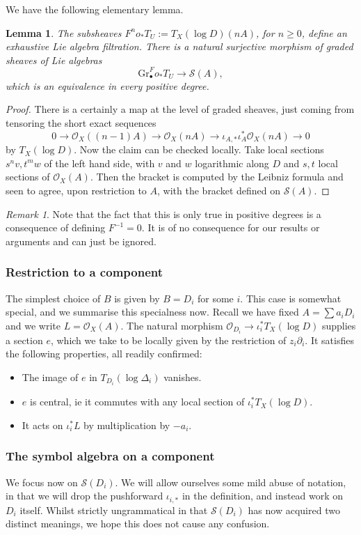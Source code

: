 \documentclass[12pt, oneside]{amsart}       %
\newtheorem{lemma}[theorem]{Lemma}
\theoremstyle{remark}
\newtheorem*{remark}{Remark}
\renewcommand{\geq}{\geqslant}
\newcommand{\OO}{\mathcal{O}}
\begin{document}
We have the following elementary lemma.
\begin{lemma}\label{symbols} The subsheaves $F^no_*T_U:=T_X(\log D)(nA)$, for $n\geq0$, define an exhaustive Lie algebra filtration. There is a natural surjective morphism of graded sheaves of Lie algebras
$$\mathrm{Gr}_\bullet^F o_*T_U\longrightarrow\mathcal{S}(A),$$
which is an equivalence in every positive degree. 
\end{lemma} \begin{proof} There is a certainly a map at the level of graded sheaves, just coming from tensoring the short exact sequences $$0\to \OO_X((n-1)A)\to\OO_X(nA)\to\iota_{A,*}\iota_A^*\OO_X(nA)\to 0$$ by $T_X(\log D)$. Now the claim can be checked locally. Take local sections $s^{n}v,t^mw$ of the left hand side, with $v$ and $w$ logarithmic along $D$ and $s,t$ local sections of $\OO_X(A)$. Then the bracket is computed by the Leibniz formula and seen to agree, upon restriction to $A$, with the bracket defined on $\mathcal{S}(A)$.  \end{proof}

\begin{remark} Note that the fact that this is only true in positive degrees is a consequence of defining $F^{-1}=0$. It is of no consequence for our results or arguments and can just be ignored. \end{remark}
\subsubsection{Restriction to a component} The simplest choice of $B$ is given by $B=D_i$ for some $i$. This case is somewhat special, and we summarise this specialness now. Recall we have fixed $A=\sum a_iD_i$ and we write $L=\OO_X(A)$. The natural morphism $\OO_{D_i}\to \iota_i^*T_X(\log D)$ supplies a section $e$, which we take to be locally given by the restriction of $z_i\partial_i$. It satisfies the following properties, all readily confirmed: \begin{itemize}\item The image of $e$ in $T_{D_i}(\log \Delta_i)$ vanishes. \item $e$ is central, ie it commutes with any local section of $\iota_i^*T_X(\log D)$. \item It acts on $\iota_i^*L$ by multiplication by $-a_i$.\end{itemize}



\subsubsection{The symbol algebra on a component}\label{S algebra} We focus now on $\mathcal{S}(D_i)$. We will allow ourselves some mild abuse of notation, in that we will drop the pushforward $\iota_{i,*}$ in the definition, and instead work on $D_i$ itself. Whilst strictly ungrammatical in that $\mathcal{S}(D_i)$ has now acquired two distinct meanings, we hope this does not cause any confusion.
\end{document}
